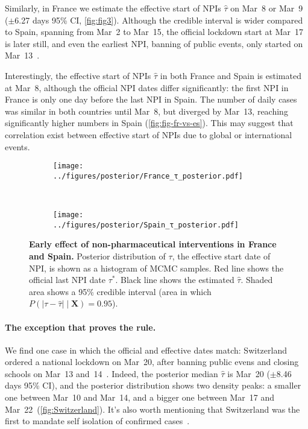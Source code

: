 \documentclass[12pt]{extarticle}
\let\vec\mathbf
\begin{document}
Similarly, in France we estimate the effective start of NPIs $\hat{\tau}$ on Mar~8 or Mar~9 ($\pm$6.27 days 95\% CI, \autoref{fig:fig3}). Although the credible interval is wider compared to Spain, spanning from Mar~2 to Mar~15, the official lockdown start at Mar~17 is later still, and even the earliest NPI, banning of public events, only started on Mar~13~\citep{Flaxman2020}.

Interestingly, the effective start of NPIs $\hat{\tau}$ in both France and Spain is estimated at Mar~8, although the official NPI dates differ significantly: the first NPI in France is only one day before the last NPI in Spain.
The number of daily cases was similar in both countries until Mar~8, but diverged by Mar~13, reaching significantly higher numbers in Spain (\autoref{fig:fig-fr-vs-es}).
This may suggest that correlation exist between effective start of NPIs due to global or international events.



\begin{figure}[h]
    \centering
    \begin{subfigure}{0.45\textwidth}
        \texttt{[image: ../figures/posterior/France\_τ\_posterior.pdf]}
    \end{subfigure}
    ~
    \begin{subfigure}{0.45\textwidth}
        \texttt{[image: ../figures/posterior/Spain\_τ\_posterior.pdf]}
    \end{subfigure}
    \caption{
    \textbf{Early effect of non-pharmaceutical interventions in France and Spain.}
    Posterior distribution of $\tau$, the effective start date of NPI, is shown as a histogram of MCMC samples. Red line shows the official last NPI date $\tau^*$. Black line shows the estimated $\hat{\tau}$. Shaded area shows a 95\% credible interval (area in which $P(|\tau - \hat{\tau}| \mid \vec{X}) = 0.95$). 
	}
	\label{fig:fig3}
\end{figure}


\paragraph*{The exception that proves the rule.}
We find one case in which the official and effective dates match: Switzerland ordered a national lockdown on Mar~20, after banning public evens and closing schools on Mar~13 and~14~\citep{Flaxman2020}.
Indeed, the posterior median $\hat{\tau}$ is Mar~20 ($\pm$8.46 days 95\% CI), and the posterior distribution shows two density peaks: a smaller one between Mar~10 and Mar~14, and a bigger one between Mar~17 and Mar~22~(\autoref{fig:Switzerland}). It's also worth mentioning that Switzerland was the first to mandate self isolation of confirmed cases~\citep{Flaxman2020}.
\end{document}
